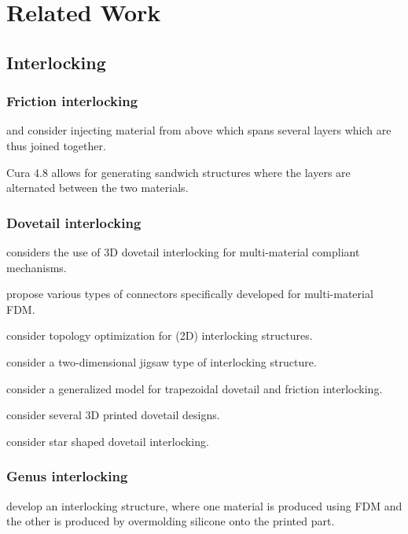 \section{Related Work}

\subsection{Interlocking}

\subsubsection{Friction interlocking}

\cite{Duty2019} and \cite{Kazmer2020} consider injecting material from above which spans several layers which are thus joined together.

Cura 4.8 allows for generating sandwich structures where the layers are alternated between the two materials.

\subsubsection{Dovetail interlocking}

\cite{gouker2006manufacturing} considers the use of 3D dovetail interlocking for multi-material compliant mechanisms.

\cite{debora2020} propose various types of connectors specifically developed for multi-material FDM.

\cite{aharoni2021} consider topology optimization for (2D) interlocking structures.

\cite{malik2017} consider a two-dimensional jigsaw type of interlocking structure.

\cite{Li2013} consider a generalized model for trapezoidal dovetail and friction interlocking.

\cite{Ribeiro2019} consider several 3D printed dovetail designs.

\cite{Wang2021} consider star shaped dovetail interlocking.


\subsubsection{Genus interlocking}

\cite{Rossing2020} develop an interlocking structure, where one material is produced using FDM and the other is produced by overmolding silicone onto the printed part.


